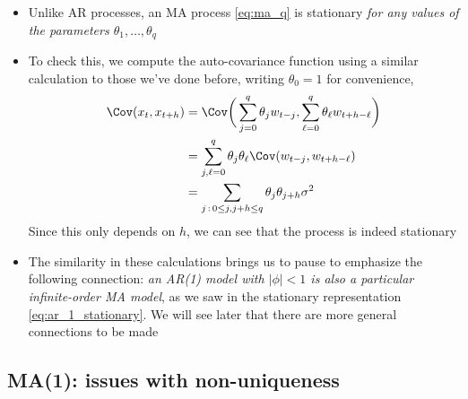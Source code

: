 \documentclass{article}
\begin{document}
\begin{itemize}
\item Unlike AR processes, an MA process \eqref{eq:ma_q} is stationary \emph{for
    any values of the parameters $\theta_1,\dots,\theta_q$}

\item To check this, we compute the auto-covariance function using a similar
  calculation to those we've done before, writing $\theta_0 = 1$ for
  convenience,
  \begin{align}
  \nonumber
  \Cov(x_t, x_{t+h}) &= \Cov\bigg( \sum_{j=0}^q \theta_j w_{t-j}, 
  \sum_{\ell=0}^q \theta_\ell w_{t+h-\ell} \bigg) \\
  \nonumber
  &= \sum_{j,\ell=0}^q \theta_j \theta_\ell \Cov( w_{t-j}, w_{t+h-\ell} ) \\
  \label{eq:ma_q_auto_cov}
  &= \sum_{j \,:\, 0 \leq j,  j +h \leq q} \theta_j \theta_{j+h} \sigma^2
  \end{align}
  Since this only depends on $h$, we can see that the process is indeed
  stationary 

\item The similarity in these calculations brings us to pause to emphasize the
  following connection: \emph{an AR(1) model with $|\phi| < 1$ is also a
    particular infinite-order MA model}, as we saw in the stationary
  representation \eqref{eq:ar_1_stationary}. We will see later that there are
  more general connections to be made
\end{itemize}

\subsection{MA(1): issues with non-uniqueness}
\end{document}
